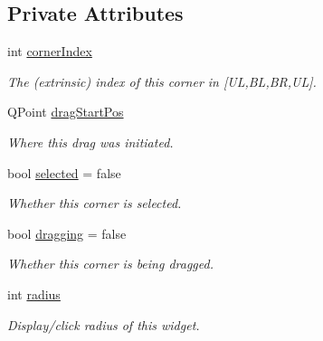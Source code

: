\subsection*{Private Attributes}
\begin{DoxyCompactItemize}
\item 
int \hyperlink{classProjectorDragCorner_a62eb190294efff15202ceb0261858677}{corner\+Index}\hypertarget{classProjectorDragCorner_a62eb190294efff15202ceb0261858677}{}\label{classProjectorDragCorner_a62eb190294efff15202ceb0261858677}

\begin{DoxyCompactList}\small\item\em The (extrinsic) index of this corner in \mbox{[}UL,BL,BR,UL\mbox{]}. \end{DoxyCompactList}\item 
Q\+Point \hyperlink{classProjectorDragCorner_ab56bbeb8dfd2cc071555b19ca4c9fb69}{drag\+Start\+Pos}\hypertarget{classProjectorDragCorner_ab56bbeb8dfd2cc071555b19ca4c9fb69}{}\label{classProjectorDragCorner_ab56bbeb8dfd2cc071555b19ca4c9fb69}

\begin{DoxyCompactList}\small\item\em Where this drag was initiated. \end{DoxyCompactList}\item 
bool \hyperlink{classProjectorDragCorner_aa17ecf70a2c928de33623bb5dc2917bd}{selected} = false\hypertarget{classProjectorDragCorner_aa17ecf70a2c928de33623bb5dc2917bd}{}\label{classProjectorDragCorner_aa17ecf70a2c928de33623bb5dc2917bd}

\begin{DoxyCompactList}\small\item\em Whether this corner is selected. \end{DoxyCompactList}\item 
bool \hyperlink{classProjectorDragCorner_adee60507c43a09879a9ab9069f5b12ba}{dragging} = false\hypertarget{classProjectorDragCorner_adee60507c43a09879a9ab9069f5b12ba}{}\label{classProjectorDragCorner_adee60507c43a09879a9ab9069f5b12ba}

\begin{DoxyCompactList}\small\item\em Whether this corner is being dragged. \end{DoxyCompactList}\item 
int \hyperlink{classProjectorDragCorner_aa2a74030da538aba14d1712a0216b526}{radius}\hypertarget{classProjectorDragCorner_aa2a74030da538aba14d1712a0216b526}{}\label{classProjectorDragCorner_aa2a74030da538aba14d1712a0216b526}

\begin{DoxyCompactList}\small\item\em Display/click radius of this widget. \end{DoxyCompactList}\end{DoxyCompactItemize}


